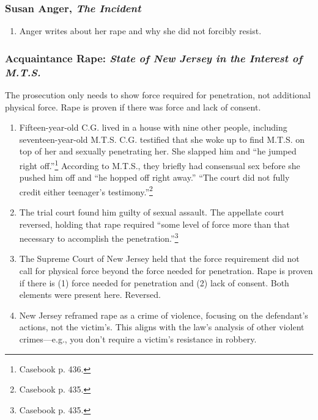 \subsubsection{Susan Anger, \emph{The Incident}}

\begin{enumerate}
    \item Anger writes about her rape and why she did not forcibly resist.
\end{enumerate}

\subsubsection{Acquaintance Rape: \emph{State of New Jersey in the Interest of 
M.T.S.}}

The prosecution only needs to show force required for penetration, not 
additional physical force. Rape is proven if there was force and lack of 
consent.

\begin{enumerate}
    \item Fifteen-year-old C.G. lived in a house with nine other people, 
    including seventeen-year-old M.T.S. C.G. testified that she woke up to 
    find M.T.S. on top of her and sexually penetrating her. She slapped him 
    and ``he jumped right off.''\footnote{Casebook p. 436.} According to 
    M.T.S., they briefly had consensual sex before she pushed him off and ``he 
    hopped off right away.'' ``The court did not fully credit either 
    teenager's testimony.''\footnote{Casebook p. 435.}
    \item The trial court found him guilty of sexual assault. The appellate 
    court reversed, holding that rape required ``some level of force more than 
    that necessary to accomplish the penetration.''\footnote{Casebook p. 435.}
    \item The Supreme Court of New Jersey held that the force requirement did 
    not call for physical force beyond the force needed for penetration. Rape 
    is proven if there is (1) force needed for penetration and (2) lack of 
    consent. Both elements were present here. Reversed.
    \item New Jersey reframed rape as a crime of violence, focusing on the 
    defendant's actions, not the victim's. This aligns with the law's analysis 
    of other violent crimes---e.g., you don't require a victim's resistance in 
    robbery.
\end{enumerate}

